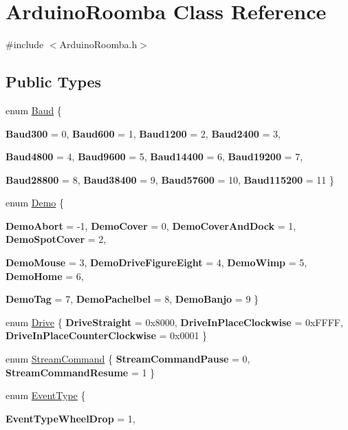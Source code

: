 \hypertarget{class_arduino_roomba}{
\section{ArduinoRoomba Class Reference}
\label{class_arduino_roomba}
}


{\ttfamily \#include $<$ArduinoRoomba.h$>$}

\subsection*{Public Types}
\begin{DoxyCompactItemize}
\item 
enum \hyperlink{class_arduino_roomba_af609a2cdb5613e540d5858dd94defc52}{Baud} \{ \par
{\bfseries Baud300} =  0, 
{\bfseries Baud600} =  1, 
{\bfseries Baud1200} =  2, 
{\bfseries Baud2400} =  3, 
\par
{\bfseries Baud4800} =  4, 
{\bfseries Baud9600} =  5, 
{\bfseries Baud14400} =  6, 
{\bfseries Baud19200} =  7, 
\par
{\bfseries Baud28800} =  8, 
{\bfseries Baud38400} =  9, 
{\bfseries Baud57600} =  10, 
{\bfseries Baud115200} =  11
 \}
\item 
enum \hyperlink{class_arduino_roomba_a7c3cccf56b26a783de296211b9e6aa7a}{Demo} \{ \par
{\bfseries DemoAbort} =  -\/1, 
{\bfseries DemoCover} =  0, 
{\bfseries DemoCoverAndDock} =  1, 
{\bfseries DemoSpotCover} =  2, 
\par
{\bfseries DemoMouse} =  3, 
{\bfseries DemoDriveFigureEight} =  4, 
{\bfseries DemoWimp} =  5, 
{\bfseries DemoHome} =  6, 
\par
{\bfseries DemoTag} =  7, 
{\bfseries DemoPachelbel} =  8, 
{\bfseries DemoBanjo} =  9
 \}
\item 
enum \hyperlink{class_arduino_roomba_af4798542a2feebafa4247d935bb2fb29}{Drive} \{ {\bfseries DriveStraight} =  0x8000, 
{\bfseries DriveInPlaceClockwise} =  0xFFFF, 
{\bfseries DriveInPlaceCounterClockwise} =  0x0001
 \}
\item 
enum \hyperlink{class_arduino_roomba_a80ef89fefa26336ed641673662ef4b6b}{StreamCommand} \{ {\bfseries StreamCommandPause} =  0, 
{\bfseries StreamCommandResume} =  1
 \}
\item 
enum \hyperlink{class_arduino_roomba_af76e2cc5c85104aae809b49a9af59a9c}{EventType} \{ \par
{\bfseries EventTypeWheelDrop} =  1, 

\end{DoxyCompactItemize}
